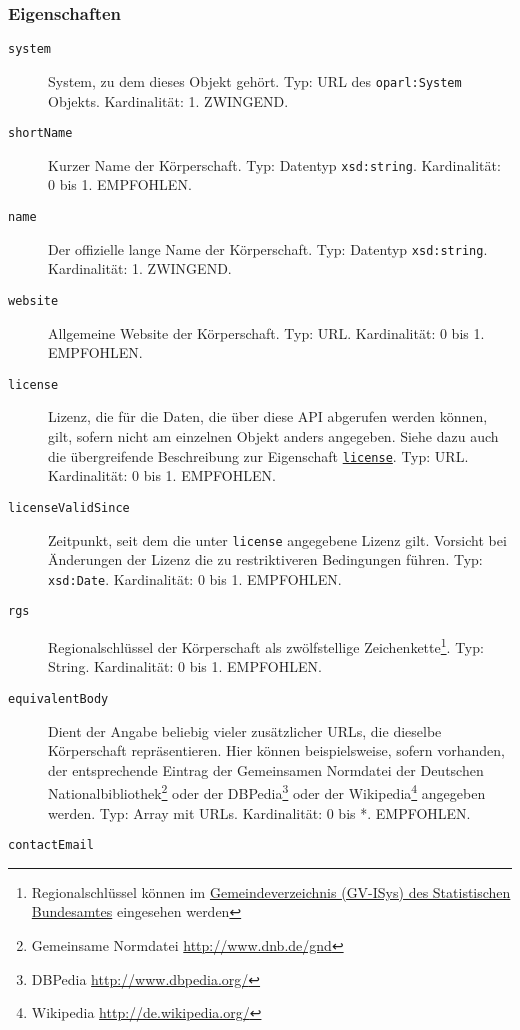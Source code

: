 \documentclass[,a4paper]{article}
\begin{document}
\subsubsection{Eigenschaften}\label{eigenschaften-1}

\begin{description}
\item[\texttt{system}]
System, zu dem dieses Objekt gehört. Typ: URL des \texttt{oparl:System}
Objekts. Kardinalität: 1. ZWINGEND.
\item[\texttt{shortName}]
Kurzer Name der Körperschaft. Typ: Datentyp \texttt{xsd:string}.
Kardinalität: 0 bis 1. EMPFOHLEN.
\item[\texttt{name}]
Der offizielle lange Name der Körperschaft. Typ: Datentyp
\texttt{xsd:string}. Kardinalität: 1. ZWINGEND.
\item[\texttt{website}]
Allgemeine Website der Körperschaft. Typ: URL. Kardinalität: 0 bis 1.
EMPFOHLEN.
\item[\texttt{license}]
Lizenz, die für die Daten, die über diese API abgerufen werden können,
gilt, sofern nicht am einzelnen Objekt anders angegeben. Siehe dazu auch
die übergreifende Beschreibung zur Eigenschaft
\hyperref[eigenschaftux5flicense]{\texttt{license}}. Typ: URL.
Kardinalität: 0 bis 1. EMPFOHLEN.
\item[\texttt{licenseValidSince}]
Zeitpunkt, seit dem die unter \texttt{license} angegebene Lizenz gilt.
Vorsicht bei Änderungen der Lizenz die zu restriktiveren Bedingungen
führen. Typ: \texttt{xsd:Date}. Kardinalität: 0 bis 1. EMPFOHLEN.
\item[\texttt{rgs}]
Regionalschlüssel der Körperschaft als zwölfstellige
Zeichenkette\footnote{Regionalschlüssel können im
  \href{https://www.destatis.de/DE/ZahlenFakten/LaenderRegionen/Regionales/Gemeindeverzeichnis/Gemeindeverzeichnis.html}{Gemeindeverzeichnis
  (GV-ISys) des Statistischen Bundesamtes} eingesehen werden}. Typ:
String. Kardinalität: 0 bis 1. EMPFOHLEN.
\item[\texttt{equivalentBody}]
Dient der Angabe beliebig vieler zusätzlicher URLs, die dieselbe
Körperschaft repräsentieren. Hier können beispielsweise, sofern
vorhanden, der entsprechende Eintrag der Gemeinsamen Normdatei der
Deutschen Nationalbibliothek\footnote{Gemeinsame Normdatei
  \url{http://www.dnb.de/gnd}} oder der DBPedia\footnote{DBPedia
  \url{http://www.dbpedia.org/}} oder der Wikipedia\footnote{Wikipedia
  \url{http://de.wikipedia.org/}} angegeben werden. Typ: Array mit URLs.
Kardinalität: 0 bis *. EMPFOHLEN.
\item[\texttt{contactEmail}]

\end{description}
\end{document}
